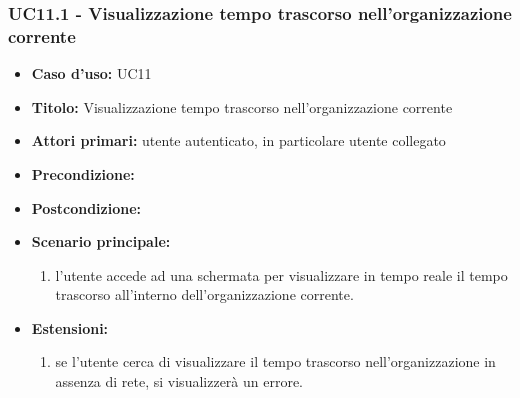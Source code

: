 \documentclass[casi-duso]{subfiles}
\begin{document}
\subsubsection{UC11.1 - Visualizzazione tempo trascorso nell'organizzazione corrente}
\label{subsub:uc11utente}
\begin{itemize}
  \item \textbf{Caso d’uso:} UC11
  \item \textbf{Titolo:} Visualizzazione tempo trascorso nell'organizzazione corrente
  \item \textbf{Attori primari:} utente autenticato, in particolare utente collegato
  \item \textbf{Precondizione:} 
  \item \textbf{Postcondizione:}
  \item \textbf{Scenario principale:} 
  \begin{enumerate}
    \item l'utente accede ad una schermata per visualizzare in tempo reale il tempo trascorso all'interno dell'organizzazione corrente.
  \end{enumerate}  
  \item \textbf{Estensioni:} 
  \begin{enumerate}
    \item se l'utente cerca di visualizzare il tempo trascorso nell'organizzazione in assenza di rete, si visualizzerà un errore.
  \end{enumerate}  
\end{itemize}
\end{document}
